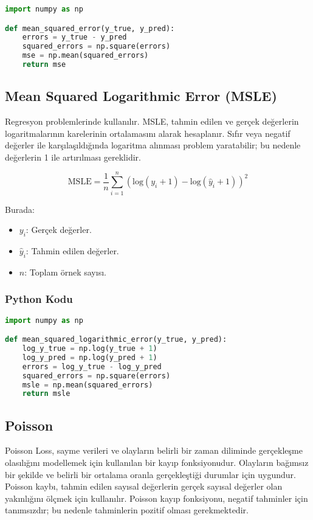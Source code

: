 \begin{lstlisting}[language=Python]
import numpy as np

def mean_squared_error(y_true, y_pred):
    errors = y_true - y_pred
    squared_errors = np.square(errors)
    mse = np.mean(squared_errors)
    return mse
\end{lstlisting}

\newpage

\subsection{Mean Squared Logarithmic Error (MSLE)}

Regresyon problemlerinde kullanılır. MSLE, tahmin edilen ve gerçek değerlerin logaritmalarının karelerinin ortalamasını alarak hesaplanır. Sıfır veya negatif değerler ile karşılaşıldığında logaritma alınması problem yaratabilir; bu nedenle değerlerin 1 ile artırılması gereklidir.

\[ \text{MSLE} = \frac{1}{n} \sum_{i=1}^{n} (\text{log}(y_i + 1) - \text{log}(\hat{y}_i + 1))^2 \]

Burada:

\begin{itemize}
    \item $y_i$: Gerçek değerler.
    \item $\hat{y}_i$: Tahmin edilen değerler.
    \item $n$: Toplam örnek sayısı.
\end{itemize}

\subsubsection{Python Kodu}

\begin{lstlisting}[language=Python]
import numpy as np

def mean_squared_logarithmic_error(y_true, y_pred):
    log_y_true = np.log(y_true + 1)
    log_y_pred = np.log(y_pred + 1)
    errors = log_y_true - log_y_pred
    squared_errors = np.square(errors)
    msle = np.mean(squared_errors)
    return msle
\end{lstlisting}

\newpage

\subsection{Poisson}

Poisson Loss, sayme verileri ve olayların belirli bir zaman diliminde gerçekleşme olasılığını modellemek için kullanılan bir kayıp fonksiyonudur. Olayların bağımsız bir şekilde ve belirli bir ortalama oranla gerçekleştiği durumlar için uygundur. Poisson kaybı, tahmin edilen sayısal değerlerin gerçek sayısal değerler olan yakınlığını ölçmek için kullanılır. Poisson kayıp fonksiyonu, negatif tahminler için tanımsızdır; bu nedenle tahminlerin pozitif olması gerekmektedir.

